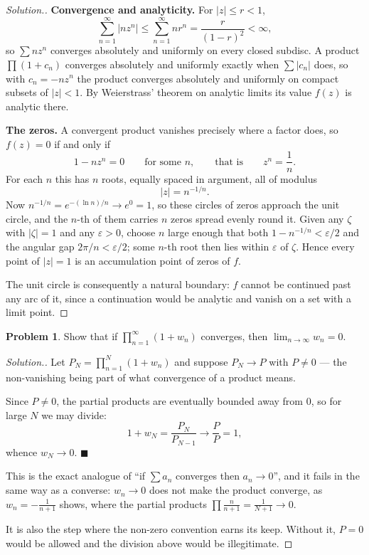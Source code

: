 \documentclass[11pt,a4paper]{article}
\theoremstyle{definition}
\newtheorem{problemx}{Problem}[section]
\newenvironment{problem}{\begin{problemx}}{\end{problemx}}
\newenvironment{solution}
  {\renewcommand{\qedsymbol}{}\begin{proof}[\textit{Solution}.]}
  {\end{proof}}
\begin{document}
\begin{solution}
\textbf{Convergence and analyticity.} For $\left|z\right| \leq r < 1$,
$$\sum^{\infty}_{n=1}\left|n z^{n}\right| \leq \sum^{\infty}_{n=1} n r^{n}
= \frac{r}{(1-r)^{2}} < \infty ,$$
so $\sum n z^n$ converges absolutely and uniformly on every closed subdisc. A
product $\prod(1 + c_n)$ converges absolutely and uniformly exactly when
$\sum\left|c_n\right|$ does, so with $c_n = -nz^n$ the product converges
absolutely and uniformly on compact subsets of $\left|z\right|<1$. By
Weierstrass' theorem on analytic limits its value $f(z)$ is analytic there.

\textbf{The zeros.} A convergent product vanishes precisely where a factor does,
so $f(z) = 0$ if and only if
$$1 - n z^{n} = 0 \qquad\text{for some } n,
\qquad\text{that is}\qquad z^{n} = \frac{1}{n}.$$
For each $n$ this has $n$ roots, equally spaced in argument, all of modulus
$$\left|z\right| = n^{-1/n}.$$
Now $n^{-1/n} = e^{-(\ln n)/n} \rightarrow e^{0} = 1$, so these circles of zeros
approach the unit circle, and the $n$-th of them carries $n$ zeros spread evenly
round it. Given any $\zeta$ with $\left|\zeta\right| = 1$ and any
$\varepsilon > 0$, choose $n$ large enough that both
$1 - n^{-1/n} < \varepsilon/2$ and the angular gap $2\pi/n < \varepsilon/2$; some
$n$-th root then lies within $\varepsilon$ of $\zeta$. Hence every point of
$\left|z\right| = 1$ is an accumulation point of zeros of $f$.

The unit circle is consequently a natural boundary: $f$ cannot be continued past
any arc of it, since a continuation would be analytic and vanish on a set with a
limit point.
\end{solution}


\begin{problem}
Show that if $\displaystyle\prod^{\infty}_{n=1}(1 + w_n)$ converges, then
$\lim_{n \rightarrow \infty} w_n = 0$.
\end{problem}

\begin{solution}
Let $P_N = \displaystyle\prod^{N}_{n=1}(1 + w_n)$ and suppose $P_N \rightarrow P$
with $P \neq 0$ --- the non-vanishing being part of what convergence of a product
means.

Since $P \neq 0$, the partial products are eventually bounded away from $0$, so
for large $N$ we may divide:
$$1 + w_N = \frac{P_N}{P_{N-1}} \longrightarrow \frac{P}{P} = 1 ,$$
whence $w_N \rightarrow 0$. $\blacksquare$

This is the exact analogue of ``if $\sum a_n$ converges then $a_n \rightarrow 0$'',
and it fails in the same way as a converse: $w_n \rightarrow 0$ does not make the
product converge, as $w_n = -\tfrac{1}{n+1}$ shows, where the partial products
$\prod \frac{n}{n+1} = \frac{1}{N+1} \rightarrow 0$.

It is also the step where the non-zero convention earns its keep. Without it,
$P = 0$ would be allowed and the division above would be illegitimate.
\end{solution}
\end{document}
